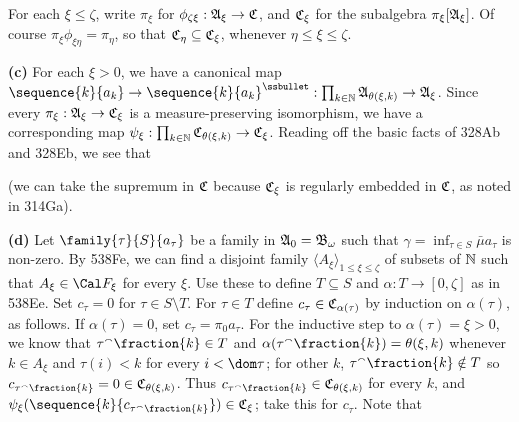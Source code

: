 {For each $\xi\le\zeta$,
write $\pi_{\xi}$ for $\phi_{\zeta\xi}:\frak A_{\xi}\to\frak C$, and
$\frak C_{\xi}$ for the subalgebra $\pi_{\xi}[\frak A_{\xi}]$.   Of
course $\pi_{\xi}\phi_{\xi\eta}=\pi_{\eta}$,
so that $\frak C_{\eta}\subseteq\frak C_{\xi}$,
whenever $\eta\le\xi\le\zeta$.

\medskip

{\bf (c)} For each $\xi>0$, we have a canonical map
$\sequence{k}{a_k}\to\sequence{k}{a_k}^{\ssbullet}:
\prod_{k\in\Bbb N}\frak A_{\theta(\xi,k)}\to\frak A_{\xi}$.   Since every
$\pi_{\xi}:\frak A_{\xi}\to\frak C_{\xi}$ is a measure-preserving
isomorphism, we have a corresponding map
$\psi_{\xi}:\prod_{k\in\Bbb N}\frak C_{\theta(\xi,k)}\to\frak C_{\xi}$.
Reading off the basic facts of 328Ab and 328Eb, we see that


\noindent (we can take the supremum in $\frak C$ because $\frak C_{\xi}$ is
regularly embedded in $\frak C$, as noted in 314Ga).

\medskip

{\bf (d)} Let $\family{\tau}{S}{a_{\tau}}$ be a family in
$\frak A_0=\frak B_{\omega}$ such that
$\gamma=\inf_{\tau\in S}\bar\mu a_{\tau}$ is non-zero.
By 538Fe, we can find a
disjoint family $\langle A_{\xi}\rangle_{1\le\xi\le\zeta}$ of subsets of
$\Bbb N$ such that $A_{\xi}\in\Cal F_{\xi}$ for every $\xi$.
Use these to define $T\subseteq S$ and $\alpha:T\to[0,\zeta]$ as in
538Ee.   Set $c_{\tau}=0$ for $\tau\in S\setminus T$.
For $\tau\in T$ define $c_{\tau}\in\frak C_{\alpha(\tau)}$
by induction on $\alpha(\tau)$, as
follows.   If $\alpha(\tau)=0$, set $c_{\tau}=\pi_0a_{\tau}$.   For the
inductive step to $\alpha(\tau)=\xi>0$, we know that
$\tau^{\smallfrown}\fraction{k}\in T$ and
$\alpha(\tau^{\smallfrown}\fraction{k})=\theta(\xi,k)$ whenever
$k\in A_{\xi}$ and $\tau(i)<k$ for every $i<\dom\tau$;  for other
$k$, $\tau^{\smallfrown}\fraction{k}\notin T$ so
$c_{\tau^{\smallfrown}\fraction{k}}=0\in\frak C_{\theta(\xi,k)}$.
Thus $c_{\tau^{\smallfrown}\fraction{k}}\in\frak C_{\theta(\xi,k)}$ for
every $k$, and
$\psi_{\xi}(\sequence{k}{c_{\tau^{\smallfrown}\fraction{k}}})
\in\frak C_{\xi}$;  take this for $c_{\tau}$.   Note that

}
